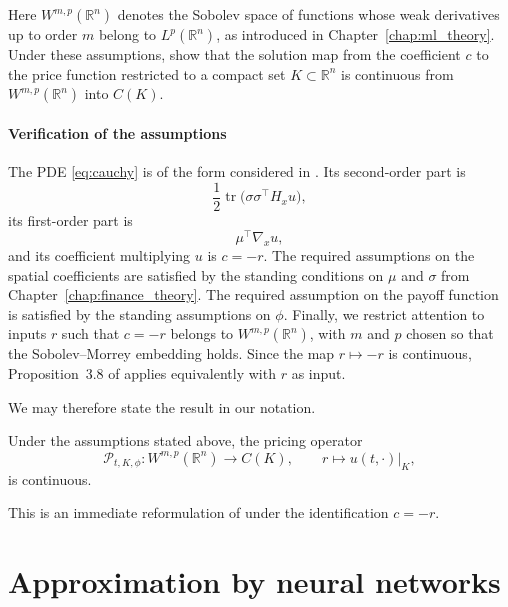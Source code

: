 Here $W^{m,p}(\mathbb{R}^n)$ denotes the Sobolev space of functions whose weak derivatives up to order $m$ belong to $L^p(\mathbb{R}^n)$, as introduced in Chapter~\ref{chap:ml_theory}. Under these assumptions, \citet{Benth2024} show that the solution map from the coefficient $c$ to the price function restricted to a compact set $K\subset\mathbb{R}^n$ is continuous from $W^{m,p}(\mathbb{R}^n)$ into $C(K)$.

\paragraph{Verification of the assumptions}

The PDE \eqref{eq:cauchy} is of the form considered in \citet[Prop.~3.8]{Benth2024}. Its second-order part is
\[
    \frac12 \operatorname{tr}\!\big(\sigma\sigma^\top H_xu\big),
\]
its first-order part is
\[
    \mu^\top \nabla_xu,
\]
and its coefficient multiplying $u$ is $c=-r$. The required assumptions on the spatial coefficients are satisfied by the standing conditions on $\mu$ and $\sigma$ from Chapter~\ref{chap:finance_theory}. The required assumption on the payoff function is satisfied by the standing assumptions on $\phi$. Finally, we restrict attention to inputs $r$ such that $c=-r$ belongs to $W^{m,p}(\mathbb{R}^n)$, with $m$ and $p$ chosen so that the Sobolev--Morrey embedding holds. Since the map $r\mapsto -r$ is continuous, Proposition~3.8 of \citet{Benth2024} applies equivalently with $r$ as input.

We may therefore state the result in our notation.

\begin{proposition}
\label{prop:continuity}
Under the assumptions stated above, the pricing operator
\[
    \mathcal{P}_{t,K,\phi}:W^{m,p}(\mathbb{R}^n)\longrightarrow C(K),
    \qquad
    r\longmapsto u(t,\cdot)\big|_K,
\]
is continuous.
\end{proposition}

This is an immediate reformulation of \citet[Prop.~3.8]{Benth2024} under the identification $c=-r$.

\section{Approximation by neural networks}
\label{sec:approximation}

